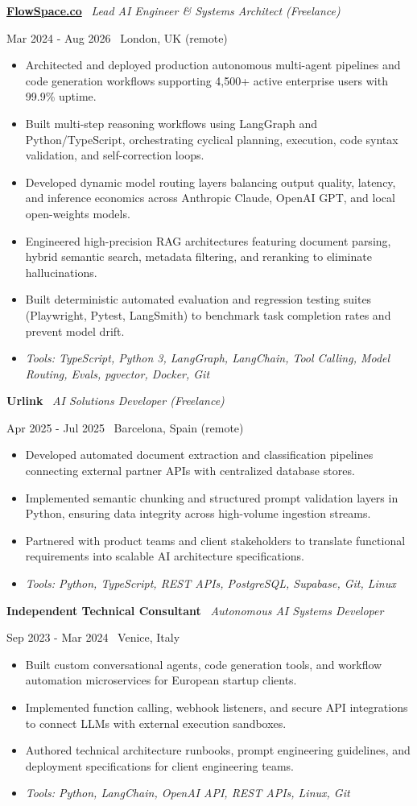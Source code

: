\documentclass[a4paper,10pt]{article}
\newcommand{\role}[4]{%
  \vspace{2pt}\noindent
  \begin{minipage}[t]{0.70\textwidth}\raggedright\textbf{#1} \textbullet\ \textit{#3}\end{minipage}%
  \hfill
  \begin{minipage}[t]{0.28\textwidth}\raggedleft\footnotesize\color{gray}#2 \textbullet\ #4\end{minipage}%
  \vspace{1pt}%
}
\begin{document}
\role{\href{https://flowspace.co}{FlowSpace.co}}{Mar 2024 - Aug 2026}{Lead AI Engineer \& Systems Architect (Freelance)}{London, UK (remote)}
\begin{itemize}
  \item Architected and deployed production autonomous multi-agent pipelines and code generation workflows supporting 4,500+ active enterprise users with 99.9\% uptime.
  \item Built multi-step reasoning workflows using LangGraph and Python/TypeScript, orchestrating cyclical planning, execution, code syntax validation, and self-correction loops.
  \item Developed dynamic model routing layers balancing output quality, latency, and inference economics across Anthropic Claude, OpenAI GPT, and local open-weights models.
  \item Engineered high-precision RAG architectures featuring document parsing, hybrid semantic search, metadata filtering, and reranking to eliminate hallucinations.
  \item Built deterministic automated evaluation and regression testing suites (Playwright, Pytest, LangSmith) to benchmark task completion rates and prevent model drift.
  \item \textit{Tools: TypeScript, Python 3, LangGraph, LangChain, Tool Calling, Model Routing, Evals, pgvector, Docker, Git}
\end{itemize}

\role{Urlink}{Apr 2025 - Jul 2025}{AI Solutions Developer (Freelance)}{Barcelona, Spain (remote)}
\begin{itemize}
  \item Developed automated document extraction and classification pipelines connecting external partner APIs with centralized database stores.
  \item Implemented semantic chunking and structured prompt validation layers in Python, ensuring data integrity across high-volume ingestion streams.
  \item Partnered with product teams and client stakeholders to translate functional requirements into scalable AI architecture specifications.
  \item \textit{Tools: Python, TypeScript, REST APIs, PostgreSQL, Supabase, Git, Linux}
\end{itemize}

\role{Independent Technical Consultant}{Sep 2023 - Mar 2024}{Autonomous AI Systems Developer}{Venice, Italy}
\begin{itemize}
  \item Built custom conversational agents, code generation tools, and workflow automation microservices for European startup clients.
  \item Implemented function calling, webhook listeners, and secure API integrations to connect LLMs with external execution sandboxes.
  \item Authored technical architecture runbooks, prompt engineering guidelines, and deployment specifications for client engineering teams.
  \item \textit{Tools: Python, LangChain, OpenAI API, REST APIs, Linux, Git}
\end{itemize}
\end{document}
